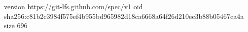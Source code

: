 version https://git-lfs.github.com/spec/v1
oid sha256:c81b2c3984f575ef4b955bd965982d18ca6668a64f26d210ec3b88b05467ca4a
size 696
